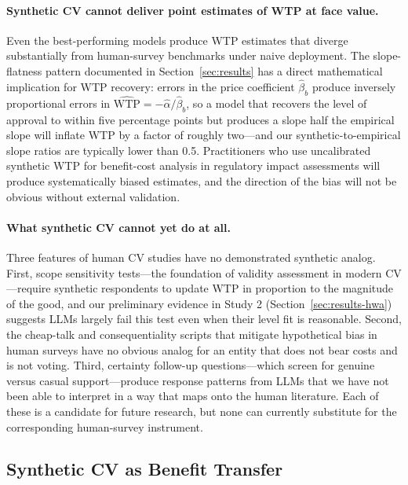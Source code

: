 \documentclass[12pt]{article}
\begin{document}
\paragraph{Synthetic CV cannot deliver point estimates of WTP at face
value.} Even the best-performing models produce WTP estimates that
diverge substantially from human-survey benchmarks under naive
deployment. The slope-flatness pattern documented in
Section~\ref{sec:results} has a direct mathematical implication for WTP
recovery: errors in the price coefficient $\hat{\beta}_b$ produce
inversely proportional errors in $\widehat{\text{WTP}} =
-\hat{\alpha}/\hat{\beta}_b$, so a model that recovers the level of
approval to within five percentage points but produces a slope half the
empirical slope will inflate WTP by a factor of roughly two---and our
synthetic-to-empirical slope ratios are typically lower than 0.5.
Practitioners who use uncalibrated synthetic WTP for benefit-cost
analysis in regulatory impact assessments will produce systematically
biased estimates, and the direction of the bias will not be obvious
without external validation.

\paragraph{What synthetic CV cannot yet do at all.} Three features of
human CV studies have no demonstrated synthetic analog. First, scope
sensitivity tests---the foundation of validity assessment in modern CV
\parencite{Johnston2017}---require synthetic respondents to update WTP
in proportion to the magnitude of the good, and our preliminary evidence
in Study 2 (Section~\ref{sec:results-hwa}) suggests LLMs largely fail
this test even when their level fit is reasonable. Second, the
cheap-talk and consequentiality scripts that mitigate hypothetical bias
in human surveys have no obvious analog for an entity that does not bear
costs and is not voting. Third, certainty follow-up questions---which
screen for genuine versus casual support---produce response patterns
from LLMs that we have not been able to interpret in a way that maps
onto the human literature. Each of these is a candidate for future
research, but none can currently substitute for the corresponding
human-survey instrument.

\subsection{Synthetic CV as Benefit Transfer}\label{sec:disc-benefit-transfer}
\end{document}
